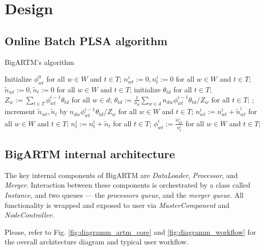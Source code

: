 \documentclass[11pt,a4paper,twoside]{report}
\begin{document}
\section{Design}

\subsection{Online Batch PLSA algorithm}

\begin{algorithm}
\caption{BigARTM's algorithm}
\label{fig:plsa_alg}
\begin{algorithmic}[1]
\STATE Initialize $\phi^0_{wt}$ for all $w \in W$ and $t \in T$;
    \STATE $n^i_{wt} := 0, n^i_t := 0$ for all $w \in W$ and $t \in T$;
		\STATE $\tilde n_{wt} := 0, \tilde n_t := 0$ for all $w \in W$ and $t \in T$;
			\STATE initialize $\theta_{td}$ for all $t \in T$;
			\REPEAT
				\STATE $Z_w := \sum_{t \in T} \phi^{i-1}_{wt} \theta_{td}$ for all $w \in d$;
				\STATE $\theta_{td} := \frac{1}{n_d} \sum_{w \in d} n_{dw} \phi^{i-1}_{wt} \theta_{td} / Z_w$
                       for all $t \in T$;
			;
			\STATE increment $\tilde n_{wt}, \tilde n_t$ by $n_{dw} \phi^{i-1}_{wt} \theta_{td} / Z_w$
                   for all $w \in W$ and $t \in T$;
		\ENDFOR
        \STATE $n^i_{wt} := n^i_{wt} + \tilde n^i_{wt}$ for all $w \in W$ and $t \in T$;
        \STATE $n^i_t := n^i_t + \tilde n_t$ for all $t \in T$;
    \ENDFOR
	\STATE $\phi^{i}_{wt} := \frac{n^i_{wt}}{n^i_{t}}$
           for all $w \in W$ and $t \in T$;
\ENDFOR
\end{algorithmic}
\end{algorithm}


\subsection{BigARTM internal architecture}

The key internal components of BigARTM are \emph{DataLoader}, \emph{Processor}, and \emph{Merger}.
Interaction between these components is orchestrated by a class called \emph{Instance},
and two queues --- the \emph{processors queue}, and the \emph{merger queue}.
All functionality is wrapped and exposed to user via \emph{MasterComponent} and \emph{NodeController}.

Please, refer to Fig. \ref{fig:diagramm_artm_core} and \ref{fig:diagramm_workflow}
for the overall architecture diagram and typical user workflow.
\end{document}
